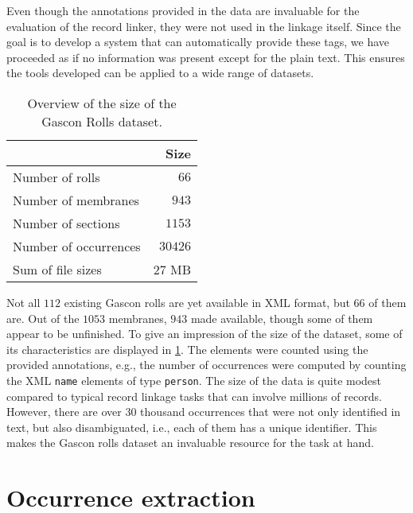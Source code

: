 Even though the annotations provided in the data are invaluable for the evaluation of the record linker, they were not used in the linkage itself.
Since the goal is to develop a system that can automatically provide these tags, we have proceeded as if no information was present except for the plain text.
This ensures the tools developed can be applied to a wide range of datasets.

\begin{table}
    \centering
    \begin{tabular}{l r}
        \toprule
        & Size \\
        \midrule
        Number of rolls & $66$ \\
        Number of membranes & $943$ \\
        Number of sections & $1153$ \\
        Number of occurrences & $30426$ \\
        Sum of file sizes & $27$ MB \\
        \bottomrule
    \end{tabular}
    \caption{Overview of the size of the Gascon Rolls dataset.}
    \label{tab:data_overview}
\end{table}

Not all $112$ existing Gascon rolls are yet available in XML format, but $66$ of them are.
Out of the $1053$ membranes, $943$ made available, though some of them appear to be unfinished.
To give an impression of the size of the dataset, some of its characteristics are displayed in \cref{tab:data_overview}.
The elements were counted using the provided annotations, e.g., the number of occurrences were computed by counting the XML \texttt{name} elements of type \texttt{person}.
The size of the data is quite modest compared to typical record linkage tasks that can involve millions of records.
However, there are over $30$ thousand occurrences that were not only identified in text, but also disambiguated, i.e., each of them has a unique identifier.
This makes the Gascon rolls dataset an invaluable resource for the task at hand.




\section{Occurrence extraction}
\label{sec:occurrence_extraction}

